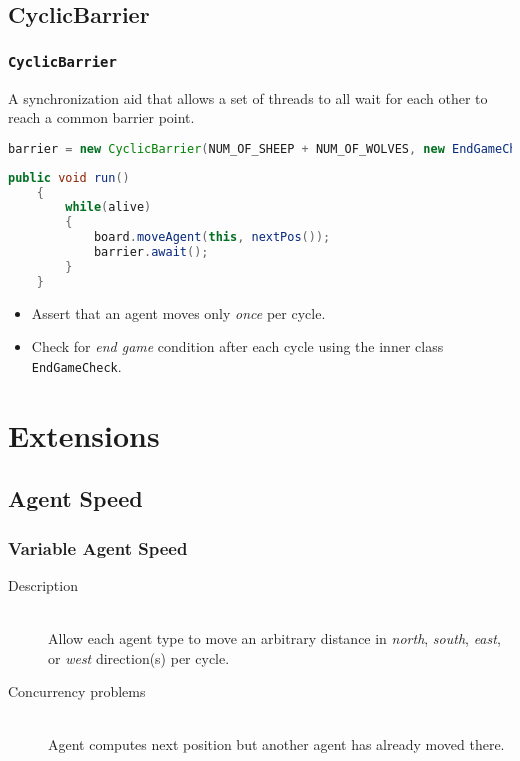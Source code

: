 \documentclass{beamer}
\begin{document}
\subsection{CyclicBarrier}
\begin{frame}[fragile]
	\frametitle{{\tt CyclicBarrier}}
	\begin{definition}
	A synchronization aid that allows a set of threads to all wait for each other to reach a common barrier point.
	\end{definition}

	\begin{lstlisting}[language=Java,caption={Initializing the {\tt CyclicBarrier} in {\tt Game.java}}]
	barrier = new CyclicBarrier(NUM_OF_SHEEP + NUM_OF_WOLVES, new EndGameCheck());
	\end{lstlisting}
	
	\begin{lstlisting}[language=Java,caption={Using the {\tt CyclicBarrier} in {\tt Agent.java}}]
	public void run()
	{
	    while(alive)
	    {
	        board.moveAgent(this, nextPos());
	        barrier.await();
	    }
	}
	\end{lstlisting}
	
	\begin{itemize}
		\item Assert that an agent moves only {\em once} per cycle.
		\item Check for {\em end game} condition after each cycle using the inner class {\tt EndGameCheck}.
	\end{itemize}
\end{frame}

\section{Extensions}

\subsection{Agent Speed}
\begin{frame}
	\frametitle{Variable Agent Speed}	
	\begin{description}
		\item[Description] \hfill \\
		Allow each agent type to move an arbitrary distance in {\em north}, {\em south}, {\em east}, or {\em west} direction(s) per cycle.
		\item[Concurrency problems] \hfill \\
		Agent computes next position but another agent has already moved there.
	\end{description}
\end{frame}
\end{document}
